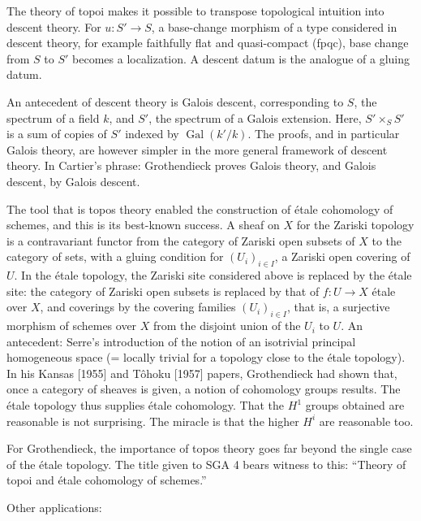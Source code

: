 \documentclass[11pt]{article}
\begin{document}
The theory of topoi makes it possible to transpose topological intuition into descent theory. For \(u:S'\to S\), a base-change morphism of a type considered in descent theory, for example faithfully flat and quasi-compact (fpqc), base change from \(S\) to \(S'\) becomes a localization. A descent datum is the analogue of a gluing datum.

An antecedent of descent theory is Galois descent, corresponding to \(S\), the spectrum of a field \(k\), and \(S'\), the spectrum of a Galois extension. Here, \(S'\times_S S'\) is a sum of copies of \(S'\) indexed by \(\operatorname{Gal}(k'/k)\). The proofs, and in particular Galois theory, are however simpler in the more general framework of descent theory. In Cartier's phrase: Grothendieck proves Galois theory, and Galois descent, by Galois descent.

The tool that is topos theory enabled the construction of étale cohomology of schemes, and this is its best-known success. A sheaf on \(X\) for the Zariski topology is a contravariant functor from the category of Zariski open subsets of \(X\) to the category of sets, with a gluing condition for \((U_i)_{i\in I}\), a Zariski open covering of \(U\). In the étale topology, the Zariski site considered above is replaced by the étale site: the category of Zariski open subsets is replaced by that of \(f:U\to X\) étale over \(X\), and coverings by the covering families \((U_i)_{i\in I}\), that is, a surjective morphism of schemes over \(X\) from the disjoint union of the \(U_i\) to \(U\). An antecedent: Serre's introduction of the notion of an isotrivial principal homogeneous space (= locally trivial for a topology close to the étale topology). In his Kansas [1955] and Tôhoku [1957] papers, Grothendieck had shown that, once a category of sheaves is given, a notion of cohomology groups results. The étale topology thus supplies étale cohomology. That the \(H^1\) groups obtained are reasonable is not surprising. The miracle is that the higher \(H^i\) are reasonable too.

For Grothendieck, the importance of topos theory goes far beyond the single case of the étale topology. The title given to SGA 4 bears witness to this: ``Theory of topoi and étale cohomology of schemes.''

Other applications:
\end{document}
